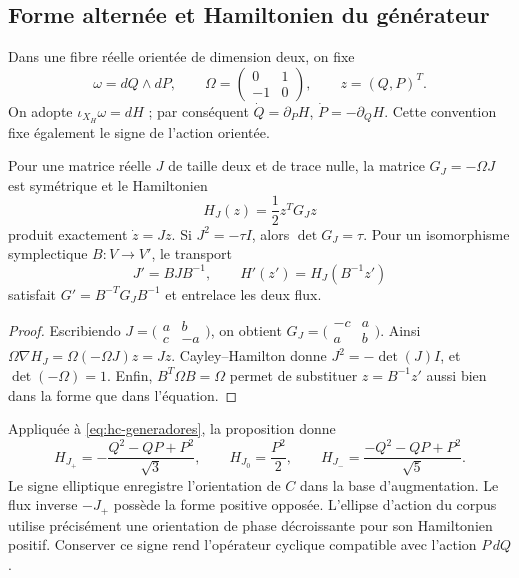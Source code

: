 \subsection{Forme alternée et Hamiltonien du générateur}

Dans une fibre réelle orientée de dimension deux, on fixe
\[
 \omega=dQ\wedge dP,\qquad
 \Omega=\begin{pmatrix}0&1\\-1&0\end{pmatrix},\qquad z=(Q,P)^T.
\]
On adopte \(\iota_{X_H}\omega=dH\) ; par conséquent \(\dot Q=\partial_PH\), \(\dot P=-\partial_QH\). Cette convention fixe également le signe de l'action orientée.

\begin{proposition}
\label{prop:hc-cuadratica}
Pour une matrice réelle \(J\) de taille deux et de trace nulle, la matrice
\(G_J=-\Omega J\) est symétrique et le Hamiltonien
\begin{equation}
 H_J(z)=\frac12z^TG_Jz
 \label{eq:hc-hj}
\end{equation}
produit exactement \(\dot z=Jz\). Si \(J^2=-\tau I\),
alors \(\det G_J=\tau\). Pour un isomorphisme symplectique
\(B:V\to V'\), le transport
\[
 J'=BJB^{-1},\qquad H'(z')=H_J(B^{-1}z')
\]
satisfait \(G'=B^{-T}G_JB^{-1}\) et entrelace les deux flux.
\end{proposition}
\begin{proof}
Escribiendo \(J=\bigl(\begin{smallmatrix}a&b\\c&-a\end{smallmatrix}\bigr)\), on obtient \(G_J=\bigl(\begin{smallmatrix}-c&a\\a&b\end{smallmatrix}\bigr)\). Ainsi \(\Omega\nabla H_J=\Omega(-\Omega J)z=Jz\). Cayley--Hamilton donne \(J^2=-\det(J)I\), et \(\det(-\Omega)=1\). Enfin, \(B^T\Omega B=\Omega\) permet de substituer \(z=B^{-1}z'\) aussi bien dans la forme que dans l'équation.
\end{proof}

Appliquée à \eqref{eq:hc-generadores}, la proposition donne
\begin{equation}
 H_{J_+}=-\frac{Q^2-QP+P^2}{\sqrt3},\qquad
 H_{J_0}=\frac{P^2}{2},\qquad
 H_{J_-}=\frac{-Q^2-QP+P^2}{\sqrt5}.
 \label{eq:hc-hamiltonianos-nativos}
\end{equation}
Le signe elliptique enregistre l’orientation de \(C\) dans la base d’augmentation.
Le flux inverse \(-J_+\) possède la forme positive opposée. L’ellipse
d’action du corpus utilise précisément une orientation de phase
décroissante pour son Hamiltonien positif. Conserver ce signe rend
l’opérateur cyclique compatible avec l’action \(P\,dQ\).

